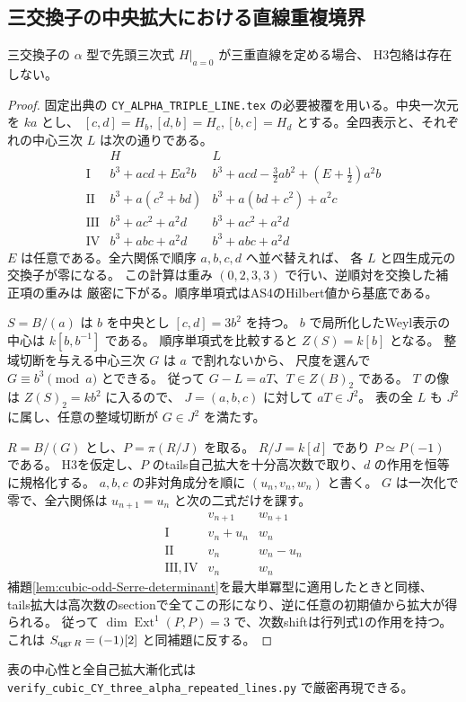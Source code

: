\subsection{三交換子の中央拡大における直線重複境界}
\label{subsec:cubic-CY-three-alpha-nonsmooth}

\begin{proposition}\label{prop:cubic-CY-three-alpha-triple-empty}
三交換子の $\alpha$ 型で先頭三次式 $H|_{a=0}$ が三重直線を定める場合、
H3包絡は存在しない。
\end{proposition}
\begin{proof}
固定出典\cite{AS4CYpinned}の \texttt{CY\_ALPHA\_TRIPLE\_LINE.tex}
の必要被覆を用いる。中央一次元を $ka$ とし、
$[c,d]=H_b,[d,b]=H_c,[b,c]=H_d$ とする。全四表示と、それぞれの中心三次 $L$
は次の通りである。
\[
\begin{array}{c|l|l}
 &H&L\\ \hline
 \mathrm{I}&b^3+acd+Ea^2b&
 b^3+acd-\tfrac32ab^2+(E+\tfrac12)a^2b\\
 \mathrm{II}&b^3+a(c^2+bd)&b^3+a(bd+c^2)+a^2c\\
 \mathrm{III}&b^3+ac^2+a^2d&b^3+ac^2+a^2d\\
 \mathrm{IV}&b^3+abc+a^2d&b^3+abc+a^2d
\end{array}
\]
$E$ は任意である。全六関係で順序 $a,b,c,d$ へ並べ替えれば、
各 $L$ と四生成元の交換子が零になる。
この計算は重み $(0,2,3,3)$ で行い、逆順対を交換した補正項の重みは
厳密に下がる。順序単項式はAS4のHilbert値から基底である。

$S=B/(a)$ は $b$ を中央とし $[c,d]=3b^2$ を持つ。
$b$ で局所化したWeyl表示の中心は $k[b,b^{-1}]$ である。
順序単項式を比較すると $Z(S)=k[b]$ となる。
整域切断を与える中心三次 $G$ は $a$ で割れないから、
尺度を選んで $G\equiv b^3\pmod a$ とできる。
従って $G-L=aT$、$T\in Z(B)_2$ である。
$T$ の像は $Z(S)_2=kb^2$ に入るので、
$J=(a,b,c)$ に対して $aT\in J^2$。
表の全 $L$ も $J^2$ に属し、任意の整域切断が $G\in J^2$ を満たす。

$R=B/(G)$ とし、$P=\pi(R/J)$ を取る。
$R/J=k[d]$ であり $P\simeq P(-1)$ である。
H3を仮定し、$P$ のtails自己拡大を十分高次数で取り、$d$ の作用を恒等に規格化する。
$a,b,c$ の非対角成分を順に $(u_n,v_n,w_n)$ と書く。
$G$ は一次化で零で、全六関係は $u_{n+1}=u_n$ と次の二式だけを課す。
\[
\begin{array}{c|cc}
 & v_{n+1}&w_{n+1}\\ \hline
 \mathrm{I}&v_n+u_n&w_n\\
 \mathrm{II}&v_n&w_n-u_n\\
 \mathrm{III},\mathrm{IV}&v_n&w_n
\end{array}
\]
補題\ref{lem:cubic-odd-Serre-determinant}を最大単冪型に適用したときと同様、
tails拡大は高次数のsectionで全てこの形になり、逆に任意の初期値から拡大が得られる。
従って $\dim\operatorname{Ext}^1(P,P)=3$ で、次数shiftは行列式1の作用を持つ。
これは $S_{\operatorname{qgr} R}=(-1)[2]$ と同補題に反する。
\end{proof}
表の中心性と全自己拡大漸化式は
\texttt{verify\_cubic\_CY\_three\_alpha\_repeated\_lines.py} で厳密再現できる。

